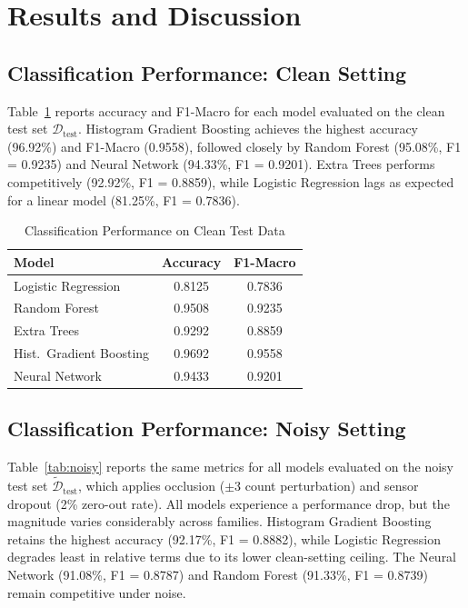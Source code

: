 \documentclass[conference,onecolumn,12pt]{IEEEtran}
\begin{document}
\section{Results and Discussion}
\label{sec:results}

\subsection{Classification Performance: Clean Setting}

Table~\ref{tab:clean} reports accuracy and F1-Macro for each model evaluated
on the clean test set $\mathcal{D}_{\text{test}}$. Histogram Gradient
Boosting achieves the highest accuracy (96.92\%) and F1-Macro (0.9558),
followed closely by Random Forest (95.08\%, F1 = 0.9235) and Neural Network
(94.33\%, F1 = 0.9201). Extra Trees performs competitively (92.92\%, F1 =
0.8859), while Logistic Regression lags as expected for a linear model
(81.25\%, F1 = 0.7836).

\begin{table}[h]
  \centering
  \caption{Classification Performance on Clean Test Data}
  \label{tab:clean}
  \renewcommand{\arraystretch}{1.2}
  \begin{tabular}{lcc}
    \toprule
    \textbf{Model} & \textbf{Accuracy} & \textbf{F1-Macro} \\
    \midrule
    Logistic Regression     & 0.8125 & 0.7836 \\
    Random Forest           & 0.9508 & 0.9235 \\
    Extra Trees             & 0.9292 & 0.8859 \\
    Hist.\ Gradient Boosting & 0.9692 & 0.9558 \\
    Neural Network          & 0.9433 & 0.9201 \\
    \bottomrule
  \end{tabular}
\end{table}

\subsection{Classification Performance: Noisy Setting}

Table~\ref{tab:noisy} reports the same metrics for all models evaluated on
the noisy test set $\tilde{\mathcal{D}}_{\text{test}}$, which applies
occlusion ($\pm$3 count perturbation) and sensor dropout (2\% zero-out rate).
All models experience a performance drop, but the magnitude varies
considerably across families. Histogram Gradient Boosting retains the highest
accuracy (92.17\%, F1 = 0.8882), while Logistic Regression degrades least in
relative terms due to its lower clean-setting ceiling. The Neural Network
(91.08\%, F1 = 0.8787) and Random Forest (91.33\%, F1 = 0.8739) remain
competitive under noise.
\end{document}
